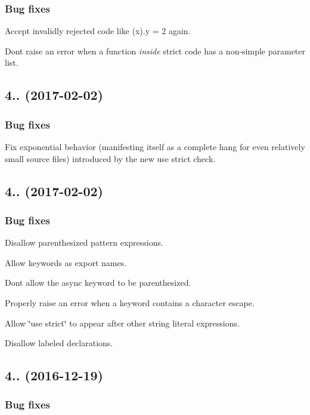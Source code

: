 \subsubsection*{Bug fixes}

Accept invalidly rejected code like {\ttfamily (x).y = 2} again.

Don\textquotesingle{}t raise an error when a function {\itshape inside} strict code has a non-\/simple parameter list.

\subsection*{4.. (2017-\/02-\/02)}

\subsubsection*{Bug fixes}

Fix exponential behavior (manifesting itself as a complete hang for even relatively small source files) introduced by the new \textquotesingle{}use strict\textquotesingle{} check.

\subsection*{4.. (2017-\/02-\/02)}

\subsubsection*{Bug fixes}

Disallow parenthesized pattern expressions.

Allow keywords as export names.

Don\textquotesingle{}t allow the {\ttfamily async} keyword to be parenthesized.

Properly raise an error when a keyword contains a character escape.

Allow {\ttfamily \char`\"{}use strict\char`\"{}} to appear after other string literal expressions.

Disallow labeled declarations.

\subsection*{4.. (2016-\/12-\/19)}

\subsubsection*{Bug fixes}

